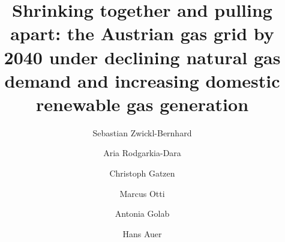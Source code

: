 \documentclass[review]{elsarticle}
\begin{document}
\begin{frontmatter}

\title{Shrinking together and pulling apart: the Austrian gas grid by 2040 under declining natural gas demand and increasing domestic renewable gas generation}
\author[1,2]{Sebastian Zwickl-Bernhard}
\author[3]{Aria Rodgarkia-Dara}
\author[3]{Christoph Gatzen}
\author[1]{Marcus Otti}
\author[1]{Antonia Golab}
\author[1,2]{Hans Auer}
\address[1]{Energy Economics Group (EEG), Technische Universität Wien, Gusshausstrasse 25-29/E370-3, 1040 Wien, Austria}
\address[2]{Industrial Economics and Technology Management, Norwegian University of Science and Technology, Gløshaugen, Alfred Getz vei 3, Trondheim, 7491, Norway}
\address[3]{Frontier Economics Limited, 71 High Holborn, London WC1V 6DA, United Kingdom}

\begin{abstract}
\end{abstract}

\begin{keyword}

\end{keyword}
\end{frontmatter}
%
\end{document}
